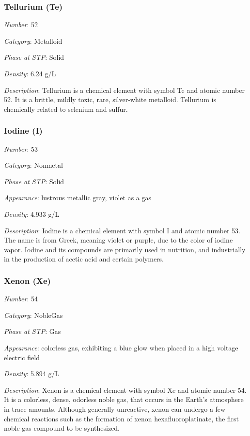 \documentclass{article}
\begin{document}
\hypertarget{subsubsection::Te}{}\subsubsection{Tellurium (Te)}

\textit{Number}: 52

\textit{Category}: Metalloid

\textit{Phase at STP}: Solid

\textit{Density}: 6.24 g/L

\textit{Description}: Tellurium is a chemical element with symbol Te and atomic number 52. It is a brittle, mildly toxic, rare, silver-white metalloid. Tellurium is chemically related to selenium and sulfur.

\hypertarget{subsubsection::I}{}\subsubsection{Iodine (I)}

\textit{Number}: 53

\textit{Category}: Nonmetal

\textit{Phase at STP}: Solid

\textit{Appearance}: lustrous metallic gray, violet as a gas

\textit{Density}: 4.933 g/L

\textit{Description}: Iodine is a chemical element with symbol I and atomic number 53. The name is from Greek, meaning violet or purple, due to the color of iodine vapor. Iodine and its compounds are primarily used in nutrition, and industrially in the production of acetic acid and certain polymers.

\hypertarget{subsubsection::Xe}{}\subsubsection{Xenon (Xe)}

\textit{Number}: 54

\textit{Category}: NobleGas

\textit{Phase at STP}: Gas

\textit{Appearance}: colorless gas, exhibiting a blue glow when placed in a high voltage electric field

\textit{Density}: 5.894 g/L

\textit{Description}: Xenon is a chemical element with symbol Xe and atomic number 54. It is a colorless, dense, odorless noble gas, that occurs in the Earth's atmosphere in trace amounts. Although generally unreactive, xenon can undergo a few chemical reactions such as the formation of xenon hexafluoroplatinate, the first noble gas compound to be synthesized.
\end{document}
